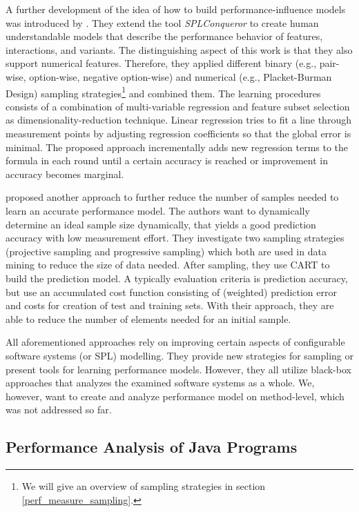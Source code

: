 A further development of the idea of how to build performance-influence models was introduced by \cite{siegmund2015performance}. They extend the tool \textit{SPLConqueror} to create human understandable models that describe the performance behavior of features, interactions, and variants. The distinguishing aspect of this work is that they also support numerical features. Therefore, they applied different binary (e.g., pair-wise, option-wise, negative option-wise) and numerical (e.g., Placket-Burman Design) sampling strategies\footnote{We will give an overview of sampling strategies in section \ref{perf_measure_sampling}.} and combined them. The learning procedures consists of a combination of multi-variable regression and feature subset selection as dimensionality-reduction technique. Linear regression tries to fit a line through measurement points by adjusting regression coefficients so that the global error is minimal. The proposed approach incrementally adds new regression terms to the formula in each round until a certain accuracy is reached or improvement in accuracy becomes marginal.

\cite{sarkar2015cost} proposed another approach to further reduce the number of samples needed to learn an accurate performance model. The authors want to dynamically determine an ideal sample size dynamically, that yields a good prediction accuracy with low measurement effort. They investigate two sampling strategies (projective sampling and progressive sampling) which both are used in data mining to reduce the size of data needed. After sampling, they use CART to build the prediction model. A typically evaluation criteria is prediction accuracy, but \cite{sarkar2015cost} use an accumulated cost function consisting of (weighted) prediction error and costs for creation of test and training sets. With their approach, they are able to reduce the number of elements needed for an initial sample. 

All aforementioned approaches rely on improving certain aspects of configurable software systems (or \ac{SPL}) modelling. They provide new strategies for sampling or present tools for learning performance models. However, they all utilize black-box approaches that analyzes the examined software systems as a whole. We, however, want to create and analyze performance model on method-level, which was not addressed so far.

\subsection{Performance Analysis of Java Programs}
\label{rel_perf_java}

